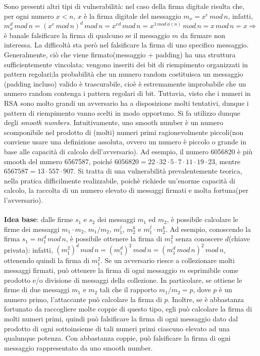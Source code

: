 Sono presenti altri tipi di vulnerabilità: nel caso della firma digitale risulta che, per ogni numero $x < n$, $x$ è la firma digitale del messaggio $m_{x} = x^e \,  mod \, n$, infatti, $m_{x}^d \, mod \, n = (x^e \, mod \, n)^d \, mod \, n = x^{ed} \, mod \, n = x^{1 \, mod \, \phi(n)} \, mod \, n = x \, mod \, n = x \Rightarrow$ è banale falsificare la firma di qualcuno se il messaggio $m$ da firmare non interessa. La difficoltà sta però nel falsificare la firma di uno
specifico messaggio. \\ Generalmente, ciò che viene firmato(messaggio + padding) ha una struttura sufficientemente vincolata: vengono inseriti dei bit di riempimento organizzati in pattern regolari;la probabilità che un numero random costituisca un messaggio (padding incluso) valido è trascurabile, cioè è estremamente improbabile che un numero random contenga i pattern regolari di bit. Tuttavia, visto che i numeri in RSA sono molto grandi un avversario ha a disposizione molti tentativi, dunque i pattern di riempimento vanno scelti in modo opportuno. Si fa utilizzo dunque degli \textit{smooth numbers}. Intuitivamente, uno smooth number è un numero scomponibile nel prodotto di (molti) numeri primi ragionevolmente piccoli(non conviene usare una definizione assoluta, ovvero un numero è piccolo o grande in base alle capacità di calcolo dell'avversario). Ad esempio, il numero 6056820 è più smooth del numero 6567587, poiché $6056820 = 22 \cdot 32 \cdot 5 \cdot 7 \cdot 11 \cdot 19 \cdot 23$, mentre $ 6567587 = 13 \cdot 557 \cdot 907$. Si tratta di una vulnerabilità prevalentemente teorica, nella pratica difficilmente realizzabile, poichè richiede un'enorme capacità di calcolo, la raccolta di un numero elevato di messaggi firmati e molta fortuna(per l'avversario). \\ \\
\textbf{Idea base}: dalle firme $s_{1}$ e $s_{2}$ dei messaggi $m_{1}$ ed $m_{2}$, è possibile calcolare le firme dei messaggi $m_{1} \cdot m_{2}$, $m_{1}/m_{2}$, $m_{1}^j$, $m_{2}^k$ e $m_{1}^j \cdot m_{2}^k$. Ad esempio, conoscendo la firma $s_{1} = m_{1}^d \, mod \, n $, è possibile ottenere la firma di $m_{1}^2$ senza conoscere $d$(chiave privata): infatti, $(m_{1}^2)^d \, mod \, n = (m_{1}^d)^2 \, mod \, n = (m_{1}^d \, mod \, n)^2 \, mod \, n $, ottenendo quindi la firma di $m_{1}^2$. Se un avversario riesce a collezionare molti messaggi firmati, può ottenere la firma di ogni messaggio $m$ esprimibile come prodotto e/o divisione di messaggi della collezione. In particolare, se ottiene le firme di due messaggi $m_{1}$ e $m_{2}$ tali che il rapporto $m_{1}/m_{2}=p$, dove $p$ è un numero primo, l'attaccante può calcolare la firma di $p$. Inoltre, se è abbastanza fortunato da raccogliere molte coppie di questo tipo, egli può calcolare la firma di molti numeri primi, quindi può falsificare la firma di ogni messaggio dato dal prodotto di ogni sottoinsieme di tali numeri primi ciascuno elevato ad una qualunque potenza. Con abbastanza coppie, può falsificare la firma di ogni messaggio rappresentato da uno smooth number. 

